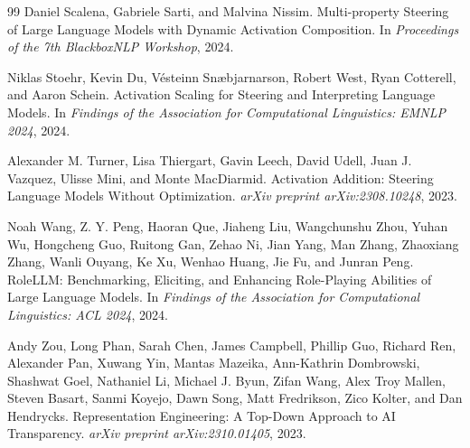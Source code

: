 \documentclass[11pt]{article}
\begin{document}
\begin{thebibliography}{99}
Daniel Scalena, Gabriele Sarti, and Malvina Nissim.
\newblock Multi-property Steering of Large Language Models with Dynamic Activation Composition.
\newblock In \emph{Proceedings of the 7th BlackboxNLP Workshop}, 2024.

Niklas Stoehr, Kevin Du, V\'esteinn Sn\ae bjarnarson, Robert West, Ryan Cotterell, and Aaron Schein.
\newblock Activation Scaling for Steering and Interpreting Language Models.
\newblock In \emph{Findings of the Association for Computational Linguistics: EMNLP 2024}, 2024.

Alexander M. Turner, Lisa Thiergart, Gavin Leech, David Udell, Juan J. Vazquez, Ulisse Mini, and Monte MacDiarmid.
\newblock Activation Addition: Steering Language Models Without Optimization.
\newblock \emph{arXiv preprint arXiv:2308.10248}, 2023.

Noah Wang, Z. Y. Peng, Haoran Que, Jiaheng Liu, Wangchunshu Zhou, Yuhan Wu, Hongcheng Guo, Ruitong Gan, Zehao Ni, Jian Yang, Man Zhang, Zhaoxiang Zhang, Wanli Ouyang, Ke Xu, Wenhao Huang, Jie Fu, and Junran Peng.
\newblock RoleLLM: Benchmarking, Eliciting, and Enhancing Role-Playing Abilities of Large Language Models.
\newblock In \emph{Findings of the Association for Computational Linguistics: ACL 2024}, 2024.

Andy Zou, Long Phan, Sarah Chen, James Campbell, Phillip Guo, Richard Ren, Alexander Pan, Xuwang Yin, Mantas Mazeika, Ann-Kathrin Dombrowski, Shashwat Goel, Nathaniel Li, Michael J. Byun, Zifan Wang, Alex Troy Mallen, Steven Basart, Sanmi Koyejo, Dawn Song, Matt Fredrikson, Zico Kolter, and Dan Hendrycks.
\newblock Representation Engineering: A Top-Down Approach to AI Transparency.
\newblock \emph{arXiv preprint arXiv:2310.01405}, 2023.

\end{thebibliography}
\end{document}
